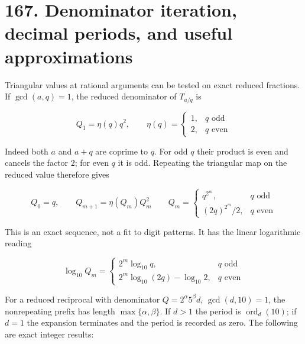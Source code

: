 \documentclass[
  11pt,
]{book}
\begin{document}
\section{167. Denominator iteration, decimal periods, and useful
approximations}\label{denominator-iteration-decimal-periods-and-useful-approximations}

Triangular values at rational arguments can be tested on exact reduced
fractions. If \(\gcd(a,q)=1\), the reduced denominator of \(T_{a/q}\) is

\[
Q_1=\eta(q)q^2,\qquad
\eta(q)=\begin{cases}1,&q\text{ odd}\\2,&q\text{ even}
\end{cases}
\tag{167.1}
\]

Indeed both \(a\) and \(a+q\) are coprime to \(q\). For odd \(q\) their
product is even and cancels the factor \(2\); for even \(q\) it is odd.
Repeating the triangular map on the reduced value therefore gives

\[
Q_0=q,\qquad Q_{m+1}=\eta(Q_m)Q_m^2
\qquad
Q_m=\begin{cases}q^{2^m},&q\text{ odd}\\
(2q)^{2^m}/2,&q\text{ even}
\end{cases}
\tag{167.2}
\]

This is an exact sequence, not a fit to digit patterns. It has the
linear logarithmic reading

\[
\log_{10}Q_m=
\begin{cases}2^m\log_{10}q,&q\text{ odd}\\
2^m\log_{10}(2q)-\log_{10}2,&q\text{ even}
\end{cases}
\tag{167.3}
\]

For a reduced reciprocal with denominator \(Q=2^\alpha5^\beta d\),
\(\gcd(d,10)=1\), the nonrepeating prefix has length
\(\max\{\alpha,\beta\}\). If \(d>1\) the period is
\(\operatorname{ord}_d(10)\); if \(d=1\) the expansion terminates and
the period is recorded as zero. The following are exact integer results:
\end{document}
